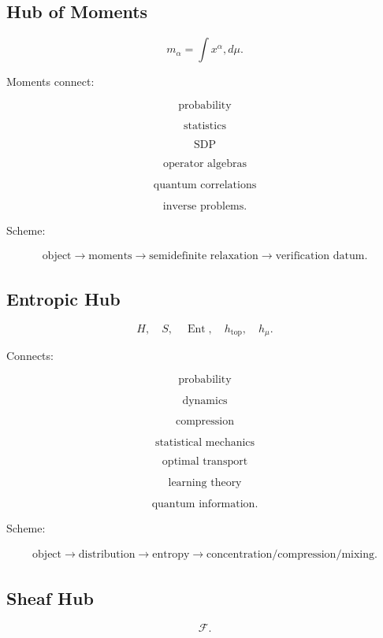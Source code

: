 \documentclass[11pt]{article}
\begin{document}
\subsection{Hub of Moments}

\[
m_\alpha=\int x^\alpha,d\mu.
\]

Moments connect:

\[
\text{probability}
\]

\[
\text{statistics}
\]

\[
\text{SDP}
\]

\[
\text{operator algebras}
\]

\[
\text{quantum correlations}
\]

\[
\text{inverse problems}.
\]

Scheme:

\[
\begin{gathered}
\text{object} \to \text{moments} \to \text{semidefinite relaxation} \to \text{verification datum}.
\end{gathered}
\]



\subsection{Entropic Hub}

\[
H,\quad S,\quad \operatorname{Ent},\quad h_{\mathrm{top}},\quad h_\mu.
\]

Connects:

\[
\text{probability}
\]

\[
\text{dynamics}
\]

\[
\text{compression}
\]

\[
\text{statistical mechanics}
\]

\[
\text{optimal transport}
\]

\[
\text{learning theory}
\]

\[
\text{quantum information}.
\]

Scheme:

\[
\begin{gathered}
\text{object} \to \text{distribution} \to \text{entropy} \to \text{concentration/compression/mixing}.
\end{gathered}
\]



\subsection{Sheaf Hub}

\[
\mathcal F.
\]
\end{document}
